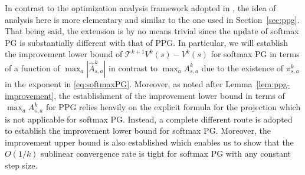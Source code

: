  In contrast to the optimization analysis framework adopted in \cite{Mei_Xiao_Szepesvari_Schuurmans_2020}, the idea of analysis here is more elementary and similar to the one used in Section~\ref{sec:ppg}. That being said, the extension is by no means trivial since the update of softmax PG is substantially different with that of PPG. In particular, we will establish the improvement lower bound of $ \mathcal{T}^{k+1}V^k(s)-V^k(s)$ for softmax PG in terms of a function of $\max_a|\hat{A}^k_{s,a}|$ in contrast to $\max_aA^k_{s,a}$ due to the existence of $\pi_{s,a}^k$ in the exponent in \eqref{eq:softmaxPG}. Moreover, as noted after Lemma~\ref{lem:ppg-improvement}, the establishment of the improvement lower bound in terms of $\max_aA^k_{s,a}$ for PPG relies heavily on the explicit formula for the projection which is not applicable for softmax PG. Instead, a complete different route is adopted to establish the improvement lower bound for softmax PG. Moreover, the improvement upper bound is also established which enables us to show that the $O(1/k)$ sublinear convergence rate is tight for softmax PG with any constant step size.
